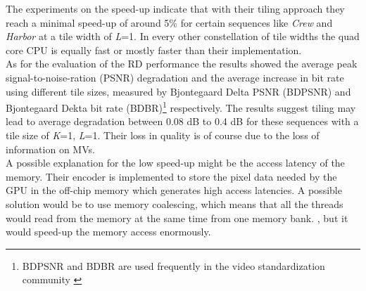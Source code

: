The experiments on the speed-up indicate that with their tiling approach they reach a minimal speed-up of around 5\% for certain sequences like \textit{Crew} and \textit{Harbor} at a tile width of \textit{L}=1. 
In every other constellation of tile widths the quad core CPU is equally fast or mostly faster than their implementation.\\

As for the evaluation of the RD performance the results showed the average peak signal-to-noise-ration (PSNR) degradation and the average increase in bit rate using different tile sizes, 
measured by Bjontegaard Delta PSNR (BDPSNR) and Bjontegaard Dekta bit rate (BDBR)\footnote{BDPSNR and BDBR are used frequently in the video standardization community \cite{bjontegaard}} respectively.
The results suggest tiling may lead to average degradation between 0.08 dB to 0.4 dB for these sequences with a tile size of \textit{K}=1, \textit{L}=1.
Their loss in quality is of course due to the loss of information on MVs. \\

A possible explanation for the low speed-up might be the access latency of the memory. 
Their encoder is implemented to store the pixel data needed by the GPU in the off-chip memory which generates high access latencies. 
A possible solution would be to use memory coalescing, which means that all the threads would read from the memory at the same time from one memory bank. 
, but it would speed-up the memory access enormously.
\\

